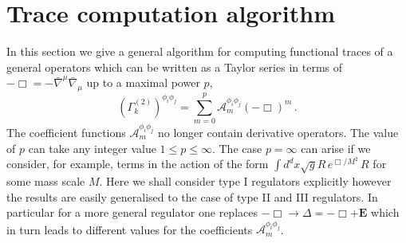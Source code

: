 \documentclass[notitlepage,eqsecnum,bm,amsmath,preprintnumbers,superscriptaddress,nofootinbib,aps,11pt]{revtex4-1}
\begin{document}
\section{\bf Trace computation algorithm}\label{sec:QAlgorithm}
\label{sec:TraceAlgorithm}
In this section we give a general algorithm for computing functional traces of a general operators which can be written as a Taylor series in terms of $-\Box=- \bar \nabla^\mu \bar \nabla_\mu$  up to a maximal power $p$,
\begin{equation}\label{Am}
\left(\Gamma^{(2)}_k\right)^{\phi_i\phi_j}=\sum_{m=0}^{p} \mathcal{A}^{\phi_i\phi_j}_m (-\Box)^m\, .
\end{equation}
The coefficient functions $\mathcal{A}^{\phi_i\phi_j}_m$ no longer contain derivative operators. The value of $p$ can take any integer value $1 \leq p \leq \infty $. The case $p = \infty$ can arise if we consider, for example, terms in the action of the form $\int d^dx \sqrt{g} R  \, e^{\Box/M^2} \, R$ for some mass scale $M$. Here we shall consider type I regulators explicitly however the results are easily generalised to the case of type II and III regulators. In particular for a more general regulator one replaces $-\Box \to \Delta= -\Box + \mathbf{E}$ which in turn leads to different values for the coefficients $\mathcal{A}^{\phi_i\phi_j}_m$.
\end{document}
